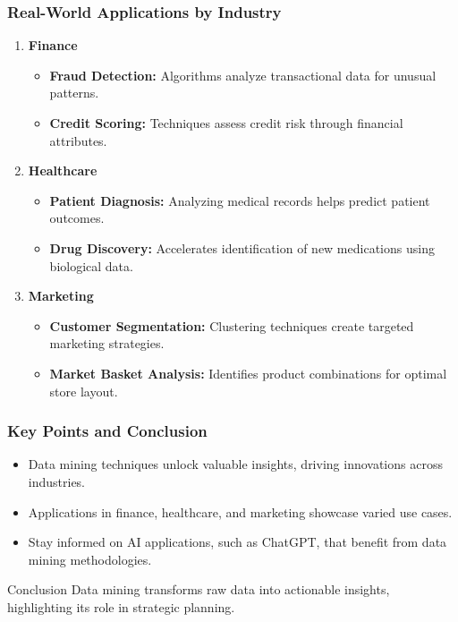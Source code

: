 \documentclass[aspectratio=169]{beamer}
\begin{document}
\begin{frame}[fragile]
    \frametitle{Real-World Applications by Industry}
    \begin{enumerate}
        \item \textbf{Finance}
        \begin{itemize}
            \item \textbf{Fraud Detection:} Algorithms analyze transactional data for unusual patterns.
            \item \textbf{Credit Scoring:} Techniques assess credit risk through financial attributes.
        \end{itemize}
    
        \item \textbf{Healthcare}
        \begin{itemize}
            \item \textbf{Patient Diagnosis:} Analyzing medical records helps predict patient outcomes.
            \item \textbf{Drug Discovery:} Accelerates identification of new medications using biological data.
        \end{itemize}

        \item \textbf{Marketing}
        \begin{itemize}
            \item \textbf{Customer Segmentation:} Clustering techniques create targeted marketing strategies.
            \item \textbf{Market Basket Analysis:} Identifies product combinations for optimal store layout.
        \end{itemize}
    \end{enumerate}
\end{frame}

\begin{frame}[fragile]
    \frametitle{Key Points and Conclusion}
    \begin{itemize}
        \item Data mining techniques unlock valuable insights, driving innovations across industries.
        \item Applications in finance, healthcare, and marketing showcase varied use cases.
        \item Stay informed on AI applications, such as ChatGPT, that benefit from data mining methodologies.
    \end{itemize}
    \begin{block}{Conclusion}
        Data mining transforms raw data into actionable insights, highlighting its role in strategic planning.
    \end{block}
\end{frame}
\end{document}
